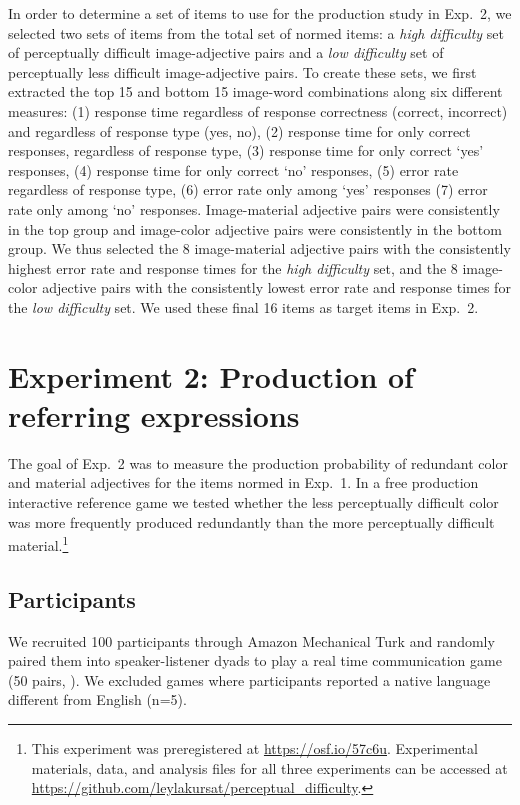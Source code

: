 \documentclass[12pt,letterpaper]{article}
\begin{document}
In order to determine a set of items to use for the production study in Exp.~2, we selected two sets of items from the total set of normed items: a \textit{high difficulty} set of perceptually difficult image-adjective pairs and a  \textit{low difficulty} set of perceptually less difficult image-adjective pairs. To create these sets, we first extracted the top 15 and bottom 15 image-word combinations along six different measures: (1) response time regardless of response correctness (correct, incorrect) and regardless of  response type (yes, no), (2) response time for only correct responses, regardless of response type, (3) response time for only correct `yes' responses, (4) response time for only correct `no' responses, (5) error rate regardless of response type, (6) error rate  only among `yes' responses (7) error rate  only among `no' responses. Image-material adjective pairs were consistently in the top group and image-color adjective pairs were consistently in the bottom group. We thus selected the 8  image-material adjective pairs with the consistently highest error rate and response times for the \textit{high difficulty} set, and the 8 image-color adjective pairs with the consistently lowest error rate and response times for the \textit{low difficulty} set. We used these final 16 items as target items in Exp.~2. 

\section{Experiment 2: Production of referring expressions} 

The goal of Exp.~2 was to measure the production probability of redundant color and material adjectives for the items normed in Exp.~1. In a free production interactive reference game we tested whether the less perceptually difficult color was more frequently produced redundantly than the more perceptually difficult material.\footnote{This  experiment was preregistered at \href{https://osf.io/57c6u}{https://osf.io/57c6u}. Experimental materials, data, and analysis files for all three experiments can be accessed at \href{https://github.com/leylakursat/perceptual_difficulty}{https://github.com/leylakursat/perceptual\_difficulty}.}

\subsection{Participants} 

We recruited 100 participants through Amazon Mechanical Turk and randomly paired them into speaker-listener dyads to play a real time communication game (50 pairs, \citealt{Hawkins2015}). We excluded games where participants reported a native language different from English (n=5).
\end{document}
